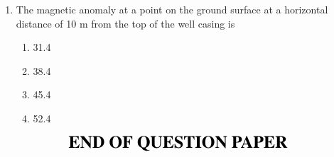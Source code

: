 \documentclass[journal,12pt,onecolumn]{IEEEtran}
\theoremstyle{remark}
\begin{document}
\begin{enumerate}
    \hfill{}
    
    \begin{multicols}{4}
        \begin{enumerate}
            \item 12.5
            \item 15.7
            \item 18.2
            \item 21.5
        \end{enumerate}
    \end{multicols}

    \item The magnetic anomaly  at a point on the ground surface at a horizontal distance of 10 m from the top of the well casing is

    \hfill{}
    
    \begin{multicols}{4}
        \begin{enumerate}
            \item 31.4
            \item 38.4
            \item 45.4
            \item 52.4
        \end{enumerate}
    \end{multicols}

\end{enumerate}

\begin{align*}
 {\LARGE{\textbf{END OF QUESTION PAPER}}}
\end{align*}
\end{document}
